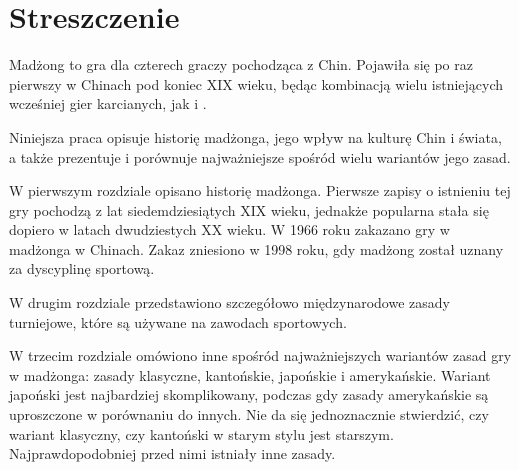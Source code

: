 \chapter*{Streszczenie}
Madżong to gra dla czterech graczy pochodząca z Chin. Pojawiła się po raz
pierwszy w Chinach pod koniec XIX wieku, będąc kombinacją wielu istniejących
wcześniej gier karcianych, jak  i . 

Niniejsza praca opisuje historię madżonga, jego wpływ na kulturę Chin i świata,
a także prezentuje i porównuje najważniejsze spośród wielu wariantów jego zasad.

W pierwszym rozdziale opisano historię madżonga. Pierwsze zapisy o
istnieniu tej gry pochodzą z lat siedemdziesiątych XIX wieku, jednakże popularna
stała się dopiero w latach dwudziestych XX wieku. W 1966 roku zakazano gry w
madżonga w Chinach. Zakaz zniesiono w 1998 roku, gdy madżong został uznany za
dyscyplinę sportową.

W drugim rozdziale przedstawiono szczegółowo międzynarodowe zasady turniejowe,
które są używane na zawodach sportowych.

W trzecim rozdziale omówiono inne spośród najważniejszych wariantów zasad gry w
madżonga: zasady klasyczne, kantońskie, japońskie i amerykańskie. Wariant
japoński  jest najbardziej skomplikowany, podczas gdy zasady
amerykańskie są uproszczone w porównaniu do innych. Nie da się jednoznacznie
stwierdzić, czy wariant klasyczny, czy kantoński w starym stylu jest starszym.
Najprawdopodobniej przed nimi istniały inne zasady.


